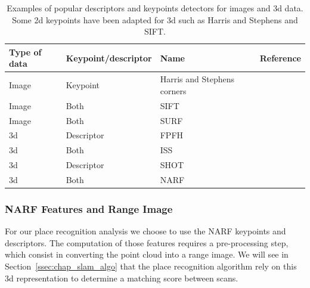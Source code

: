 \begin{table}[H]
    \centering
    \begin{tabular}{@{}llll@{}}
        \toprule
        \textbf{Type of data}  & \textbf{Keypoint/descriptor} & \textbf{Name}               & \textbf{Reference} \\
        \hline
        Image                  & Keypoint                     & Harris and Stephens corners & \cite{Harris1988}  \\
        Image                  & Both                         & SIFT                        & \cite{Lowe2004}    \\
        Image                  & Both                         & SURF                        & \cite{Bay2006}     \\
        \gls*{3d}              & Descriptor                   & FPFH                        & \cite{Rusu2009}    \\
        \gls*{3d}              & Both                         & ISS                         & \cite{Yu2009}      \\
        \gls*{3d}              & Descriptor                   & SHOT                        & \cite{Tombari2010} \\
        \gls*{3d}              & Both                         & NARF                        & \cite{Steder2011a} \\
        \bottomrule
    \end{tabular}
    \caption{ Examples of popular descriptors and keypoints detectors for images and \gls*{3d} data. Some \gls*{2d} keypoints have been adapted for \gls*{3d} such as Harris and Stephens and SIFT.}
    \label{tab:chap_slam_features_examples}
\end{table}

\subsubsection{NARF Features and Range Image}
\label{ssub:NARF Features and Range Image}

For our place recognition analysis we choose to use the NARF keypoints and descriptors. The computation of those features requires a pre-processing step, which consist in converting the point cloud into a range image. We will see in Section~\ref{ssec:chap_slam_algo} that the place recognition algorithm rely on this \gls*{3d} representation to determine a matching score between scans.

